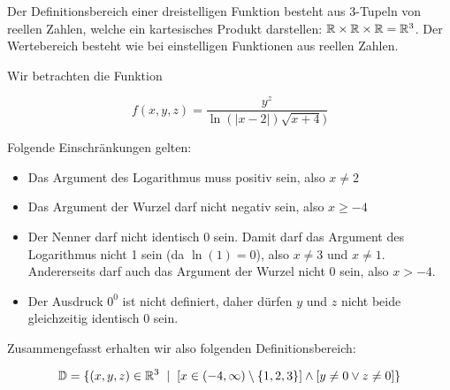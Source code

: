 \item Der Definitionsbereich einer dreistelligen Funktion besteht aus 3-Tupeln von reellen Zahlen, welche ein kartesisches Produkt darstellen: $\mathbb{R}\times\mathbb{R}\times\mathbb{R}=\mathbb{R}^3$. Der Wertebereich besteht wie bei einstelligen Funktionen aus reellen Zahlen.

Wir betrachten die Funktion

$$
	f(x,y,z) = \frac{y^z}{\ln(|x-2|)\sqrt{x+4})}
$$

Folgende Einschränkungen gelten:

\begin{itemize}
	\item Das Argument des Logarithmus muss positiv sein, also $x\ne 2$
	\item Das Argument der Wurzel darf nicht negativ sein, also $x \ge -4$
	\item Der Nenner darf nicht identisch $0$ sein. Damit darf das Argument des Logarithmus nicht 1 sein (da $\ln(1) = 0$), also $x \ne 3$ und $x \ne 1$. Andererseits darf auch das Argument der Wurzel nicht $0$ sein, also $x > -4$.
	\item Der Ausdruck $0^0$ ist nicht definiert, daher dürfen $y$ und $z$ nicht beide gleichzeitig identisch $0$ sein.
\end{itemize}

Zusammengefasst erhalten wir also folgenden Definitionsbereich:

$$
	\mathbb{D} = \lbrace (x,y,z) \in \mathbb{R}^3 \hskip 2mm | \hskip 2mm  [x \in (-4,\infty) \setminus \lbrace 1,2,3 \rbrace ] \land [ y \ne 0 \lor z \ne 0 ] \rbrace
$$